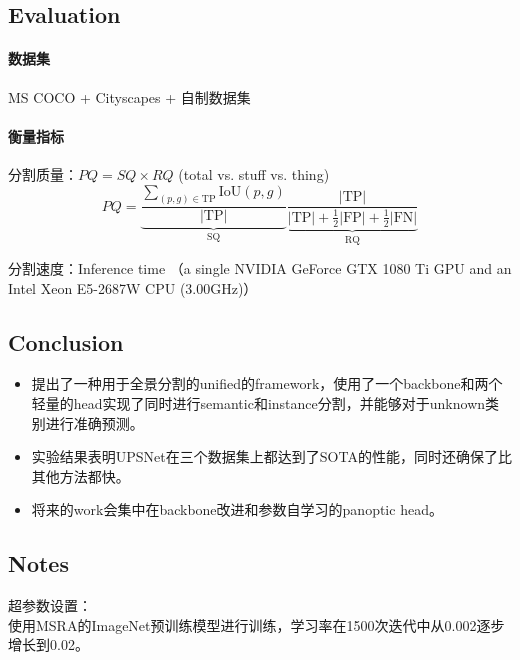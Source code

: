 \documentclass[UTF8, a4paper]{ctexart}
\begin{document}
\subsection{Evaluation} %

\paragraph{数据集} MS COCO + Cityscapes + 自制数据集
\paragraph{衡量指标} 分割质量：$PQ = SQ \times RQ$ (total vs. stuff vs. thing)
\begin{equation}
    PQ = {
        \underbrace{\frac{\sum_{(p,g) \in \text{TP}} \text{IoU}(p, g)}{ \vert \text{TP} \vert}}_{\text{SQ}} 
        \underbrace{\frac{\vert \text{TP} \vert}{\vert \text{TP} \vert + \frac{1}{2} \vert \text{FP} \vert + \frac{1}{2} \vert \text{FN} \vert }}_{\text{RQ}}
    } 
\end{equation}

分割速度：Inference time （a single NVIDIA GeForce GTX 1080 Ti GPU and an Intel Xeon E5-2687W CPU (3.00GHz)）

\subsection{Conclusion} %

\begin{itemize}
    \item 提出了一种用于全景分割的unified的framework，使用了一个backbone和两个轻量的head实现了同时进行semantic和instance分割，并能够对于unknown类别进行准确预测。
    \item 实验结果表明UPSNet在三个数据集上都达到了SOTA的性能，同时还确保了比其他方法都快。
    \item 将来的work会集中在backbone改进和参数自学习的panoptic head。
\end{itemize}

\subsection{Notes} %

超参数设置：\\
使用MSRA的ImageNet预训练模型进行训练，学习率在1500次迭代中从0.002逐步增长到0.02。
\end{document}
